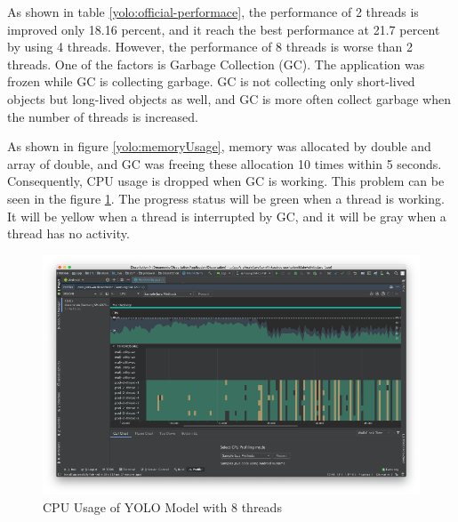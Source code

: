             As shown in table \ref{yolo:official-performace},
                the performance of 2 threads is improved only 18.16 percent,
                and it reach the best performance at 21.7 percent by using 4 threads.
            However, the performance of 8 threads is worse than 2 threads.
                One of the factors is Garbage Collection (GC).
                The application was frozen while GC is collecting garbage.
            GC is not collecting only short-lived objects but long-lived objects as well,
                and GC is more often collect garbage when the number of threads is increased.

            As shown in figure \ref{yolo:memoryUsage}, memory was allocated by double and array of double,
                and GC was freeing these allocation 10 times within 5 seconds.
            Consequently, CPU usage is dropped when GC is working.
                This problem can be seen in the figure \ref{yolo:cpuUsage}.
                The progress status will be green when a thread is working.
                It will be yellow when a thread is interrupted by GC,
                and it will be gray when a thread has no activity.

            \begin{figure}[!ht]
                \includegraphics[width=6in]{images/chapter5/YOLO/cpu-usage-8threads.png}
                \caption{CPU Usage of YOLO Model with 8 threads}
                \label{yolo:cpuUsage}
            \end{figure}

